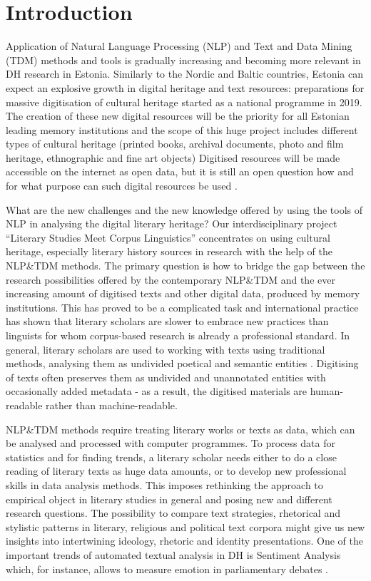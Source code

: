 \documentclass[runningheads]{llncs}
\begin{document}
\section{Introduction}

Application of Natural Language Processing (NLP) and Text and Data Mining (TDM) methods and tools is gradually increasing and becoming more relevant in DH research in Estonia. Similarly to the Nordic and Baltic countries, Estonia can expect an explosive growth in digital heritage and text resources: preparations for massive digitisation of cultural heritage started as a national programme in 2019. The creation of these new digital resources will be the priority for all Estonian leading memory institutions and the scope of this huge project includes different types of cultural heritage (printed books, archival documents, photo and film heritage, ethnographic and fine art objects) \cite{digiteerimine,viireslaak18} Digitised resources will be made accessible on the internet as open data, but it is still an open question how and for what purpose can such digital resources be used \cite{laakviires}. 

What are the new challenges and the new knowledge offered by using the tools of NLP in analysing the digital literary heritage? Our interdisciplinary project ``Literary Studies Meet Corpus Linguistics'' concentrates on using cultural heritage, especially literary history sources in research with the help of the NLP\&TDM methods. The primary question is how to bridge the gap between the research possibilities offered by the contemporary NLP\&TDM and the ever increasing amount of digitised texts and other digital data, produced by memory institutions. This has proved to be a complicated task and international practice has shown that literary scholars are slower to embrace new practices than linguists for whom corpus-based research is already a professional standard. In general, literary scholars are used to working with texts using traditional methods, analysing them as undivided poetical and semantic entities \cite{viireslaak18}. Digitising of texts often preserves them as undivided and unannotated entities with occasionally added metadata - as a result, the digitised materials are human-readable rather than machine-readable.

NLP\&TDM methods require treating literary works or texts as data, which can be analysed and processed with computer programmes. To process data for statistics and for finding trends, a literary scholar needs either to do a close reading of literary texts as huge data amounts, or to develop new professional skills in data analysis methods. This imposes rethinking the approach to empirical object in literary studies in general and posing new and different research questions. The possibility to compare text strategies, rhetorical and stylistic patterns in literary, religious and political text corpora might give us new insights into intertwining ideology, rhetoric and identity presentations. One of the important trends of automated textual analysis in DH is Sentiment Analysis which, for instance, allows to measure emotion in parliamentary debates \cite{Rheault2016}.
\end{document}
